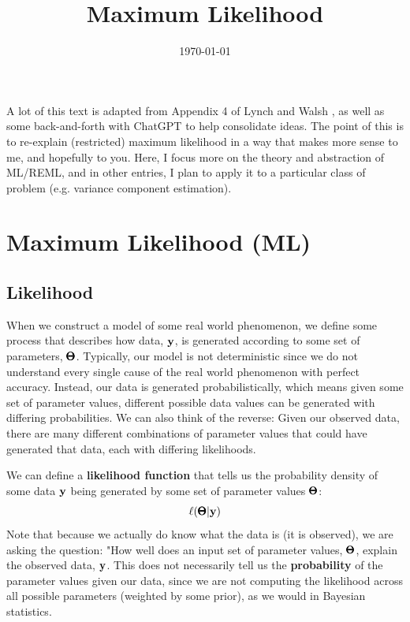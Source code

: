 \documentclass[12pt]{article}
\title{Maximum Likelihood}
\date{\today}
\begin{document}
\maketitle

A lot of this text is adapted from Appendix 4 of Lynch and Walsh \citep{lynch1998book}, as well as some back-and-forth with ChatGPT to help consolidate ideas.
The point of this is to re-explain (restricted) maximum likelihood in a way that makes more sense to me, and hopefully to you. Here, I focus more on the theory and abstraction of ML/REML, and in other entries, I plan to apply it to a particular class of problem (e.g. variance component estimation).

\section{Maximum Likelihood (ML)}

\subsection{Likelihood}

When we construct a model of some real world phenomenon, we define some process that describes how data, $\mathbf{y}$, is generated according to some set of parameters, $\pmb{\Theta}$.
Typically, our model is not deterministic since we do not understand every single cause of the real world phenomenon with perfect accuracy.
Instead, our data is generated probabilistically, which means given some set of parameter values, different possible data values can be generated with differing probabilities.
We can also think of the reverse:
Given our observed data, there are many different combinations of parameter values that could have generated that data, each with differing likelihoods.

We can define a \textbf{likelihood function} that tells us the probability density of some data $\mathbf{y}$ being generated by some set of parameter values $\pmb{\Theta}$:
$$ \ell(\pmb{\Theta} | \mathbf{y}) $$
Note that because we actually do know what the data is (it is observed), we are asking the question: "How well does an input set of parameter values, $\pmb{\Theta}$, explain the observed data, $\mathbf{y}$.
This does not necessarily tell us the \textbf{probability} of the parameter values given our data, since we are not computing the likelihood across all possible parameters (weighted by some prior), as we would in Bayesian statistics.
\end{document}
